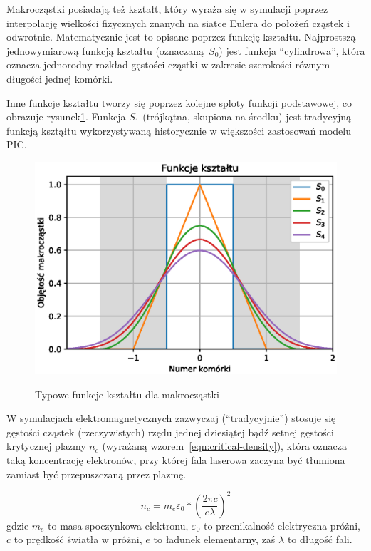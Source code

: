     Makrocząstki posiadają też kształt, który wyraża się w symulacji poprzez
    interpolację wielkości fizycznych znanych na siatce Eulera do położeń
    cząstek i odwrotnie. Matematycznie jest to opisane poprzez funkcję kształtu.
    Najprostszą jednowymiarową funkcją kształtu (oznaczaną $S_0$) jest funkcja
    ``cylindrowa'', która oznacza jednorodny rozkład gęstości cząstki w zakresie
    szerokości równym długości jednej komórki.
    
    Inne funkcje kształtu tworzy się poprzez kolejne sploty funkcji podstawowej,
    co obrazuje rysunek\ref{fig:shapefunctions}. Funkcja $S_1$ (trójkątna,
    skupiona na środku) jest tradycyjną funkcją ksztąłtu wykorzystywaną
    historycznie w większości zastosowań modelu PIC.


    \begin{figure}[h!]
      \includegraphics{Images/shapefunctions}
      \label{fig:shapefunctions}
      \caption{Typowe funkcje kształtu dla makrocząstki}
    \end{figure}

    W symulacjach elektromagnetycznych zazwyczaj (``tradycyjnie'') stosuje się
    gęstości cząstek (rzeczywistych) rzędu jednej dziesiątej bądź setnej
    gęstości krytycznej plazmy $n_c$ (wyrażaną wzorem~\ref{eqn:critical-density}),
    która oznacza taką koncentrację
    elektronów, przy której fala laserowa zaczyna być tłumiona zamiast być
    przepuszczaną przez plazmę.\cite{chen}

    \begin{equation}
        n_c = m_e \varepsilon_0 * {(\frac{2 \pi c}{e \lambda})}^2
        \label{eqn:critical-density}
    \end{equation}
    gdzie $m_e$ to masa spoczynkowa elektronu, $\varepsilon_0$ to przenikalność
    elektryczna próżni, $c$ to prędkość światła w
    próżni, $e$ to ładunek elementarny, zaś $\lambda$ to długość fali.

